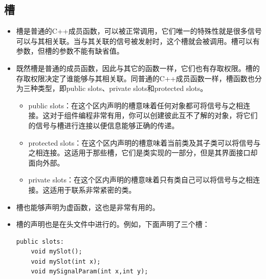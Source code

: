 \documentclass[9pt,b5paper]{article}
\begin{document}
\subsection{槽}
\label{sec-1-3}
\begin{itemize}
\item 槽是普通的C++成员函数，可以被正常调用，它们唯一的特殊性就是很多信号可以与其相关联。当与其关联的信号被发射时，这个槽就会被调用。槽可以有参数，但槽的参数不能有缺省值。
\item 既然槽是普通的成员函数，因此与其它的函数一样，它们也有存取权限。槽的存取权限决定了谁能够与其相关联。同普通的C++成员函数一样，槽函数也分为三种类型，即public slots、private slots和protected slots。
\begin{itemize}
\item public slots：在这个区内声明的槽意味着任何对象都可将信号与之相连接。这对于组件编程非常有用，你可以创建彼此互不了解的对象，将它们的信号与槽进行连接以便信息能够正确的传递。
\item protected slots：在这个区内声明的槽意味着当前类及其子类可以将信号与之相连接。这适用于那些槽，它们是类实现的一部分，但是其界面接口却面向外部。
\item private slots：在这个区内声明的槽意味着只有类自己可以将信号与之相连接。这适用于联系非常紧密的类。
\end{itemize}
\item 槽也能够声明为虚函数，这也是非常有用的。
\item 槽的声明也是在头文件中进行的。例如，下面声明了三个槽：
\lstset{language=java,label= ,caption= ,numbers=none}
\begin{lstlisting}
public slots:   
    void mySlot();   
    void mySlot(int x);   
    void mySignalParam(int x,int y);
\end{lstlisting}
\end{itemize}
\end{document}
